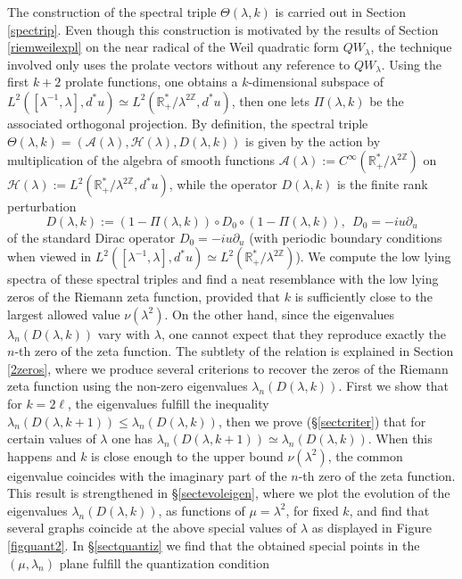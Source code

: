 \documentclass[cupthm]{CUP-JNL-JMJ}
\def\R{{\mathbb R}}
\def\Z{{\mathbb Z}}
\def\cA{{\mathcal A}}
\def\cH{{\mathcal H}}
\numberwithin{equation}{section}
\theoremstyle{cupplain}
\theoremstyle{cupdefinition}
\theoremstyle{cupremark}
\theoremstyle{cupproof}
\begin{document}
\newline  
The construction of the spectral triple $\Theta(\lambda,k)$ is carried out in   Section \ref{spectrip}. Even though this construction is motivated by the results of Section \ref{riemweilexpl} on the near radical of the Weil quadratic form $QW_\lambda$, the technique involved  only uses the prolate vectors  without any reference to $QW_\lambda$. Using the first $k+2$ prolate functions, one obtains a $k$-dimensional subspace of $L^2( [\lambda^{-1},\lambda],d^*u)\simeq L^2(\R_+^*/\lambda^{2\Z},d^*u)$, then  one lets $\Pi(\lambda,k)$ be the associated orthogonal projection. By definition, the spectral triple $\Theta(\lambda,k)=(\cA(\lambda),\cH(\lambda),D(\lambda,k))$ is given by the action by multiplication of the algebra of smooth functions $\cA(\lambda):=C^{\infty}(\R_+^*/\lambda^{2\Z})$ on $\cH(\lambda):=L^2(\R_+^*/\lambda^{2\Z},d^*u)$, while the operator $D(\lambda,k)$ is the finite rank perturbation
\begin{equation}\label{iDintro}
D(\lambda,k):=(1-\Pi(\lambda,k))\circ D_0\circ (1-\Pi(\lambda,k)), \ \  D_0=-iu\partial_u
\end{equation}
of the standard Dirac operator $D_0=-iu\partial_u$ (with periodic boundary conditions when viewed in $L^2( [\lambda^{-1},\lambda],d^*u)\simeq L^2(\R_+^*/\lambda^{2\Z})$). We compute the low lying spectra of these spectral triples and find a neat resemblance with the low lying zeros of the Riemann zeta function, provided that $k$ is sufficiently close to the largest allowed value $\nu(\lambda^2)$.  On the other hand, since the eigenvalues $\lambda_n(D(\lambda,k))$ vary with $\lambda$, one cannot expect that they reproduce exactly the $n$-th zero of the zeta function. The subtlety of the relation is  explained in Section \ref{2zeros}, where we produce  several criterions  to recover the zeros of the Riemann zeta function using the  non-zero eigenvalues $\lambda_n(D(\lambda,k))$. First we show that for $k=2\ell$, the eigenvalues fulfill the inequality $\lambda_n(D(\lambda,k+1)) \leq \lambda_n(D(\lambda,k))$, then we prove (\S \ref{sectcriter})  that for certain  values of $\lambda$ one has $\lambda_n(D(\lambda,k+1)) \simeq \lambda_n(D(\lambda,k))$. When this happens and $k$ is close enough to the upper bound $\nu(\lambda^2)$, the common eigenvalue coincides with the imaginary part of the $n$-th zero of the zeta function. This result is strengthened in \S \ref{sectevoleigen}, where we plot the evolution of the eigenvalues $\lambda_n(D(\lambda,k))$, as functions of $\mu=\lambda^2$, for fixed $k$, and find that several graphs coincide at the above special values of $\lambda$ as displayed in Figure \ref{figquant2}. In \S \ref{sectquantiz} we find that the obtained special points in the $(\mu, \lambda_n)$ plane fulfill the quantization condition 
\end{document}

